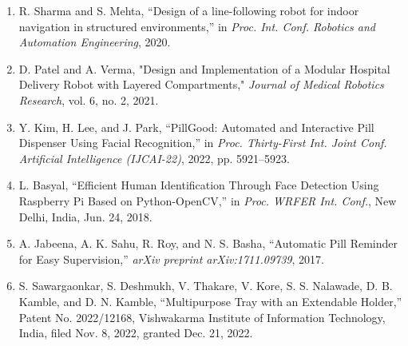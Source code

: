 \begin{enumerate}
  \item R. Sharma and S. Mehta, “Design of a line-following robot for indoor navigation in structured environments,” in \textit{Proc. Int. Conf. Robotics and Automation Engineering}, 2020.
  \item D. Patel and A. Verma, "Design and Implementation of a Modular Hospital Delivery Robot with Layered Compartments," \textit{Journal of Medical Robotics Research}, vol. 6, no. 2, 2021.
  \item Y. Kim, H. Lee, and J. Park, “PillGood: Automated and Interactive Pill Dispenser Using Facial Recognition,” in \textit{Proc. Thirty-First Int. Joint Conf. Artificial Intelligence (IJCAI-22)}, 2022, pp. 5921–5923.
  \item L. Basyal, “Efficient Human Identification Through Face Detection Using Raspberry Pi Based on Python-OpenCV,” in \textit{Proc. WRFER Int. Conf.}, New Delhi, India, Jun. 24, 2018.
  \item A. Jabeena, A. K. Sahu, R. Roy, and N. S. Basha, “Automatic Pill Reminder for Easy Supervision,” \textit{arXiv preprint arXiv:1711.09739}, 2017.
  \item S. Sawargaonkar, S. Deshmukh, V. Thakare, V. Kore, S. S. Nalawade, D. B. Kamble, and D. N. Kamble, “Multipurpose Tray with an Extendable Holder,” Patent No. 2022/12168, Vishwakarma Institute of Information Technology, India, filed Nov. 8, 2022, granted Dec. 21, 2022.
\end{enumerate}
